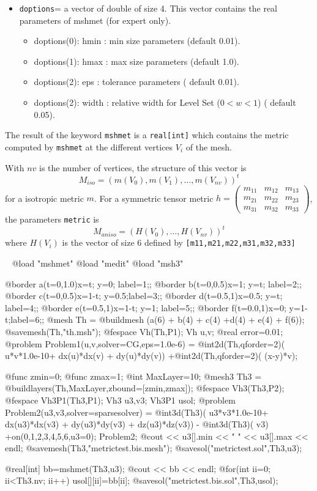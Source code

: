 \documentclass[a4paper,twoside,12pt]{book}
\begin{document}
\begin{itemize}
\item \texttt{doptions}= a vector of double of size 4. This vector contains the real parameters of mshmet (for expert only).
\begin{itemize}
\item doptions(0):  hmin : min size parameters  (default 0.01).
\item doptions(1):  hmax : max size parameters (default 1.0).
\item doptions(2):  eps : tolerance parameters ( default 0.01).
\item doptions(2):  width : relative width for Level Set ($0<w<1$) ( default 0.05).
\end{itemize}
\end{itemize}
The result of the keyword \texttt{mshmet} is a \texttt{real[int]} which contains the metric computed by  \texttt{mshmet}  at the different vertices $V_{i}$ of the mesh.

With $nv$ is the number of vertices, the structure of this vector is
$$ M_{iso}= ( m(V_0), m(V_1), \ldots, m(V_{nv}) )^t$$  for a isotropic metric $m$. For a symmetric tensor metric
$
h=\left(
\begin{array}{ccc}
m_{1 1} & m_{1 2} & m_{1 3}\\
m_{2 1} & m_{2 2} & m_{2 3} \\
m_{3 1} & m_{3 2} & m_{3 3}
\end{array}
\right)$, the parameters \texttt{metric}  is $$M_{aniso}= ( H(V_{0}), \ldots, H(V_{nv}) )^t $$
where $H(V_{i})$ is the vector of size 6 defined by \verb![m11,m21,m22,m31,m32,m33]!


\begin{example}
\label{mshmet}~
\bFF
@load "mshmet"
@load "medit"
@load "msh3"

@border a(t=0,1.0){x=t;   y=0;  label=1;};
@border b(t=0,0.5){x=1;   y=t;  label=2;};
@border c(t=0,0.5){x=1-t; y=0.5;label=3;};
@border d(t=0.5,1){x=0.5; y=t;  label=4;};
@border e(t=0.5,1){x=1-t; y=1;  label=5;};
@border f(t=0.0,1){x=0;   y=1-t;label=6;};
@mesh Th = @buildmesh (a(6) + b(4) + c(4) +d(4) + e(4) + f(6));
@savemesh(Th,"th.msh");
@fespace Vh(Th,P1);
Vh u,v;
@real error=0.01;
@problem Problem1(u,v,solver=CG,eps=1.0e-6) =
    @int2d(Th,qforder=2)( u*v*1.0e-10+  dx(u)*dx(v) + dy(u)*dy(v))
  +@int2d(Th,qforder=2)( (x-y)*v);

@func zmin=0;
@func zmax=1;
@int MaxLayer=10;
@mesh3 Th3 = @buildlayers(Th,MaxLayer,zbound=[zmin,zmax]);
@fespace Vh3(Th3,P2);
@fespace Vh3P1(Th3,P1);
Vh3 u3,v3;
Vh3P1 usol;
@problem Problem2(u3,v3,solver=sparsesolver) =
   @int3d(Th3)( u3*v3*1.0e-10+ dx(u3)*dx(v3) + dy(u3)*dy(v3) + dz(u3)*dz(v3))
  - @int3d(Th3)( v3) +on(0,1,2,3,4,5,6,u3=0);
Problem2;
@cout << u3[].min << " " << u3[].max << endl;
@savemesh(Th3,"metrictest.bis.mesh");
@savesol("metrictest.sol",Th3,u3);

@real[int] bb=mshmet(Th3,u3);
@cout << bb << endl;
@for(int ii=0; ii<Th3.nv; ii++)
  usol[][ii]=bb[ii];
@savesol("metrictest.bis.sol",Th3,usol);
\eFF
\end{example}
\end{document}

